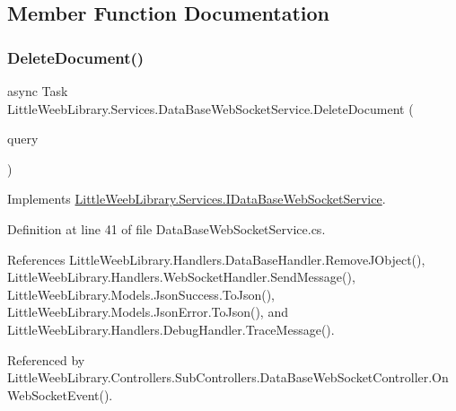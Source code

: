 \subsection{Member Function Documentation}
\mbox{\label{class_little_weeb_library_1_1_services_1_1_data_base_web_socket_service_a5d9baf510f46f6a3fac9fe84325bb017}} 
\subsubsection{\texorpdfstring{Delete\+Document()}{DeleteDocument()}}
{\footnotesize\ttfamily async Task Little\+Weeb\+Library.\+Services.\+Data\+Base\+Web\+Socket\+Service.\+Delete\+Document (\begin{DoxyParamCaption}\item[{J\+Object}]{query }\end{DoxyParamCaption})}



Implements \mbox{\hyperlink{interface_little_weeb_library_1_1_services_1_1_i_data_base_web_socket_service_a4411fbc1801df45d63aa3a0624891ef6}{Little\+Weeb\+Library.\+Services.\+I\+Data\+Base\+Web\+Socket\+Service}}.



Definition at line 41 of file Data\+Base\+Web\+Socket\+Service.\+cs.



References Little\+Weeb\+Library.\+Handlers.\+Data\+Base\+Handler.\+Remove\+J\+Object(), Little\+Weeb\+Library.\+Handlers.\+Web\+Socket\+Handler.\+Send\+Message(), Little\+Weeb\+Library.\+Models.\+Json\+Success.\+To\+Json(), Little\+Weeb\+Library.\+Models.\+Json\+Error.\+To\+Json(), and Little\+Weeb\+Library.\+Handlers.\+Debug\+Handler.\+Trace\+Message().



Referenced by Little\+Weeb\+Library.\+Controllers.\+Sub\+Controllers.\+Data\+Base\+Web\+Socket\+Controller.\+On\+Web\+Socket\+Event().



